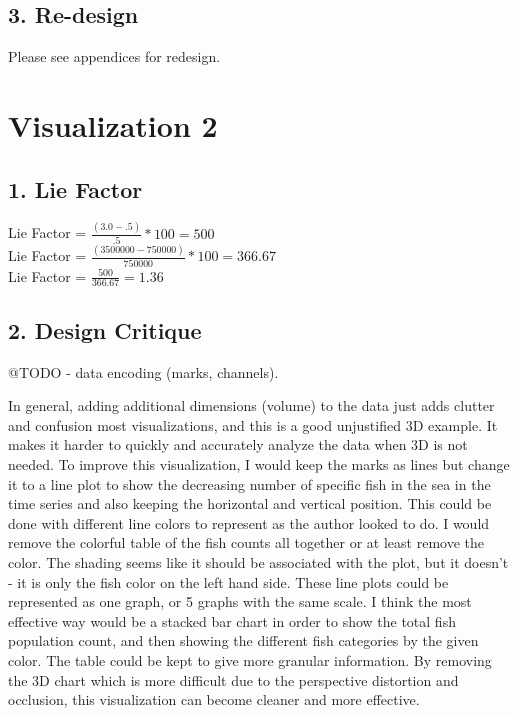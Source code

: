 \documentclass{neu_handout}
\begin{document}
\subsection*{3. Re-design}

Please see appendices for redesign.



\section*{Visualization 2}

\subsection*{1. Lie Factor}

Lie Factor = $ \frac{(3.0-.5)}{.5} * 100 = 500 $
\\

Lie Factor = $ \frac{(3500000 - 750000)}{750000} * 100 = 366.67 $
\\

Lie Factor = $ \frac{500}{366.67} = 1.36 $
\\

\subsection*{2. Design Critique}

@TODO - data encoding (marks, channels).

In general, adding additional dimensions (volume) to the data just adds clutter and confusion most visualizations, and this is a good unjustified 3D example. It makes it harder to quickly and accurately analyze the data when 3D is not needed. To improve this visualization, I would keep the marks as lines but change it to a line plot to show the decreasing number of specific fish in the sea in the time series and also keeping the horizontal and vertical position. This could be done with different line colors to represent as the author looked to do. I would remove the colorful table of the fish counts all together or at least remove the color. The shading seems like it should be associated with the plot, but it doesn't - it is only the fish color on the left hand side. These line plots could be represented as one graph, or 5 graphs with the same scale. I think the most effective way would be a stacked bar chart in order to show the total fish population count, and then showing the different fish categories by the given color. The table could be kept to give more granular information. By removing the 3D chart which is more difficult due to the perspective distortion and occlusion, this visualization can become cleaner and more effective.
\end{document}
